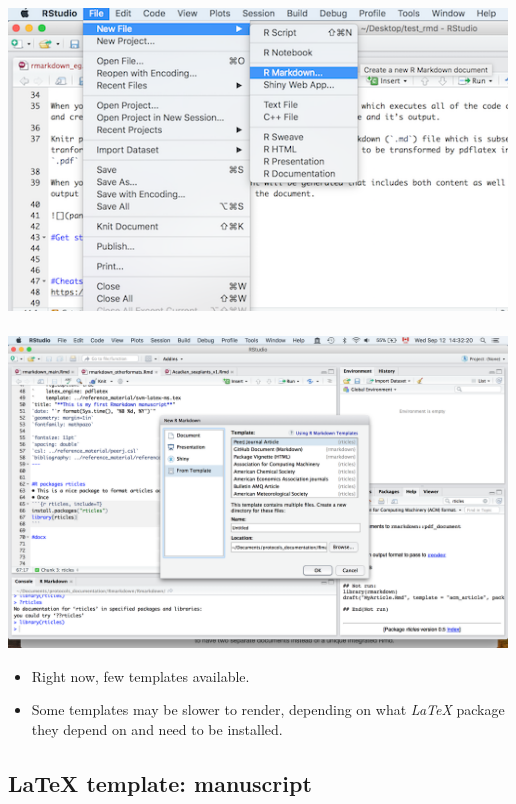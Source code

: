 \documentclass[]{article}
\begin{document}
\includegraphics[width=5.20833in,height=\textheight]{../figures/getstarted.png}\\
\hspace*{0.333em}\\
\includegraphics[width=5.20833in,height=\textheight]{../figures/from_template.png}\\
\hspace*{0.333em}

\begin{itemize}
\item
  Right now, few templates available.
\item
  Some templates may be slower to render, depending on what \emph{LaTeX}
  package they depend on and need to be installed.
\end{itemize}

\hypertarget{latex-template-manuscript}{%
\subsection{LaTeX template:
manuscript}\label{latex-template-manuscript}}
\end{document}
